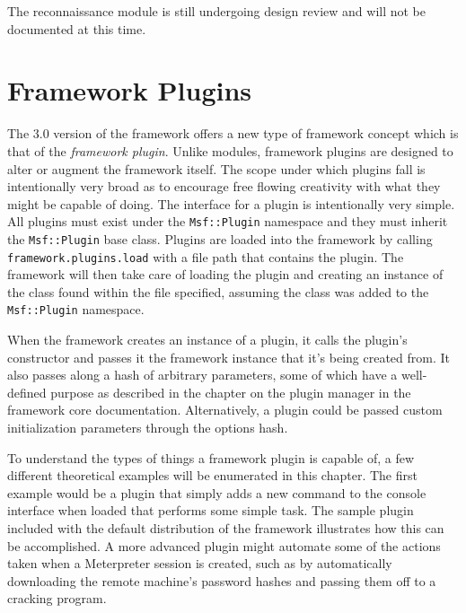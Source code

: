 \documentclass{report}
\begin{document}
\par
The reconnaissance module is still undergoing design review and will
not be documented at this time.

\chapter{Framework Plugins}
\label{framework-plugins}

\par
The 3.0 version of the framework offers a new type of framework
concept which is that of the \textit{framework plugin}.  Unlike
modules, framework plugins are designed to alter or augment the
framework itself.  The scope under which plugins fall is
intentionally very broad as to encourage free flowing creativity
with what they might be capable of doing.  The interface for a
plugin is intentionally very simple.  All plugins must exist under
the \texttt{Msf::Plugin} namespace and they must inherit the
\texttt{Msf::Plugin} base class.  Plugins are loaded into the
framework by calling \texttt{framework.plugins.load} with a file
path that contains the plugin.  The framework will then take care of
loading the plugin and creating an instance of the class found
within the file specified, assuming the class was added to the
\texttt{Msf::Plugin} namespace.

\par
When the framework creates an instance of a plugin, it calls the
plugin's constructor and passes it the framework instance that it's
being created from.  It also passes along a hash of arbitrary
parameters, some of which have a well-defined purpose as described
in the chapter on the plugin manager in the framework core
documentation.  Alternatively, a plugin could be passed custom
initialization parameters through the options hash.

\par
To understand the types of things a framework plugin is capable of,
a few different theoretical examples will be enumerated in this
chapter.  The first example would be a plugin that simply adds a new
command to the console interface when loaded that performs some
simple task.  The sample plugin included with the default
distribution of the framework illustrates how this can be
accomplished.  A more advanced plugin might automate some of the
actions taken when a Meterpreter session is created, such as by
automatically downloading the remote machine's password hashes and
passing them off to a cracking program.
\end{document}
